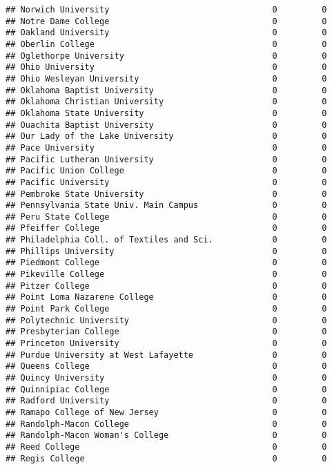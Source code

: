 \documentclass[
]{article}
\begin{document}
\begin{verbatim}
## Norwich University                                 0         0
## Notre Dame College                                 0         0
## Oakland University                                 0         0
## Oberlin College                                    0         0
## Oglethorpe University                              0         0
## Ohio University                                    0         0
## Ohio Wesleyan University                           0         0
## Oklahoma Baptist University                        0         0
## Oklahoma Christian University                      0         0
## Oklahoma State University                          0         0
## Ouachita Baptist University                        0         0
## Our Lady of the Lake University                    0         0
## Pace University                                    0         0
## Pacific Lutheran University                        0         0
## Pacific Union College                              0         0
## Pacific University                                 0         0
## Pembroke State University                          0         0
## Pennsylvania State Univ. Main Campus               0         0
## Peru State College                                 0         0
## Pfeiffer College                                   0         0
## Philadelphia Coll. of Textiles and Sci.            0         0
## Phillips University                                0         0
## Piedmont College                                   0         0
## Pikeville College                                  0         0
## Pitzer College                                     0         0
## Point Loma Nazarene College                        0         0
## Point Park College                                 0         0
## Polytechnic University                             0         0
## Presbyterian College                               0         0
## Princeton University                               0         0
## Purdue University at West Lafayette                0         0
## Queens College                                     0         0
## Quincy University                                  0         0
## Quinnipiac College                                 0         0
## Radford University                                 0         0
## Ramapo College of New Jersey                       0         0
## Randolph-Macon College                             0         0
## Randolph-Macon Woman's College                     0         0
## Reed College                                       0         0
## Regis College                                      0         0

\end{verbatim}
\end{document}
